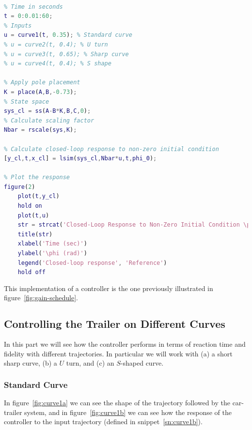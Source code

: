 \begin{lstlisting}[language=matlab, label=sn:closed-loop, caption=Method to calculate closed-loop response to non-zero initial condition, firstnumber=44]
%% Calculate closed-loop response to non-zero initial condition

% Time in seconds
t = 0:0.01:60;
% Inputs
u = curve1(t, 0.35); % Standard curve
% u = curve2(t, 0.4); % U turn
% u = curve3(t, 0.65); % Sharp curve
% u = curve4(t, 0.4); % S shape

% Apply pole placement
K = place(A,B,-0.73);
% State space
sys_cl = ss(A-B*K,B,C,0);
% Calculate scaling factor
Nbar = rscale(sys,K);

% Calculate closed-loop response to non-zero initial condition
[y_cl,t,x_cl] = lsim(sys_cl,Nbar*u,t,phi_0);

% Plot the response
figure(2)
	plot(t,y_cl)
	hold on
	plot(t,u)
	str = strcat('Closed-Loop Response to Non-Zero Initial Condition \phi_0=', str_num);
	title(str)
	xlabel('Time (sec)')
	ylabel('\phi (rad)')
	legend('Closed-loop response', 'Reference')
	hold off
\end{lstlisting}

This implementation of a controller is the one previously illustrated in figure~\ref{fig:gain-schedule}.

\subsection{Controlling the Trailer on Different Curves}\label{sec:curves}
In this part we will see how the controller performs in terms of reaction time and fidelity with different trajectories. In particular we will work with (a) a short sharp curve, (b) a $U$ turn, and (c) an $S$-shaped curve.

\subsubsection*{Standard Curve}
In figure~\ref{fig:curve1a} we can see the shape of the trajectory followed by the car-trailer system, and in figure~\ref{fig:curve1b} we can see how the response of the controller to the input trajectory (defined in snippet~\ref{sn:curve1b}).

